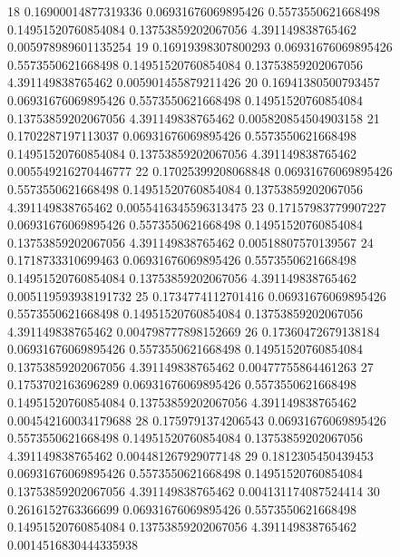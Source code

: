 {18 0.16900014877319336 0.06931676069895426 0.5573550621668498 0.14951520760854084 0.13753859202067056 4.391149838765462 0.005978989601135254
19 0.16919398307800293 0.06931676069895426 0.5573550621668498 0.14951520760854084 0.13753859202067056 4.391149838765462 0.005901455879211426
20 0.16941380500793457 0.06931676069895426 0.5573550621668498 0.14951520760854084 0.13753859202067056 4.391149838765462 0.005820854504903158
21 0.1702287197113037 0.06931676069895426 0.5573550621668498 0.14951520760854084 0.13753859202067056 4.391149838765462 0.005549216270446777
22 0.17025399208068848 0.06931676069895426 0.5573550621668498 0.14951520760854084 0.13753859202067056 4.391149838765462 0.0055416345596313475
23 0.17157983779907227 0.06931676069895426 0.5573550621668498 0.14951520760854084 0.13753859202067056 4.391149838765462 0.00518807570139567
24 0.1718733310699463 0.06931676069895426 0.5573550621668498 0.14951520760854084 0.13753859202067056 4.391149838765462 0.005119593938191732
25 0.1734774112701416 0.06931676069895426 0.5573550621668498 0.14951520760854084 0.13753859202067056 4.391149838765462 0.004798777898152669
26 0.17360472679138184 0.06931676069895426 0.5573550621668498 0.14951520760854084 0.13753859202067056 4.391149838765462 0.00477755864461263
27 0.1753702163696289 0.06931676069895426 0.5573550621668498 0.14951520760854084 0.13753859202067056 4.391149838765462 0.004542160034179688
28 0.1759791374206543 0.06931676069895426 0.5573550621668498 0.14951520760854084 0.13753859202067056 4.391149838765462 0.004481267929077148
29 0.1812305450439453 0.06931676069895426 0.5573550621668498 0.14951520760854084 0.13753859202067056 4.391149838765462 0.004131174087524414
30 0.2616152763366699 0.06931676069895426 0.5573550621668498 0.14951520760854084 0.13753859202067056 4.391149838765462 0.0014516830444335938
}\tableexpivwaitvaenet
